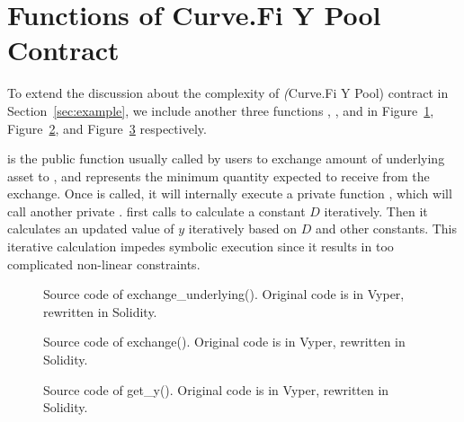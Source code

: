 \section{Functions of Curve.Fi Y Pool Contract}

To extend the discussion about the complexity of \emph(Curve.Fi Y Pool) contract
in Section~\ref{sec:example},
we include another three functions ,
,
and 
in Figure~\ref{fig:exchange_underlying},
Figure~\ref{fig:exchange},
and Figure~\ref{fig:get_y} respectively.

 is the public function usually called by users
to exchange  amount of underlying asset  to , and
 represents the minimum quantity expected to receive from the exchange. 
Once  is called, it will internally execute a private function 
, which will call another private . 
first calls  to calculate a constant $D$ iteratively. Then it calculates 
an updated value of $y$ iteratively based on $D$ and other constants. This iterative calculation
impedes symbolic execution since it results in too complicated non-linear constraints. 



\begin{figure}[t]
    \centering
    \begin{minipage}[h]{0.9\linewidth}
    
    \end{minipage}
    \caption{Source code of exchange\_underlying(). Original code is in Vyper, rewritten in Solidity.}
    \label{fig:exchange_underlying}
    \vspace{-2mm}
\end{figure}


\begin{figure}[t]
    \centering
    \begin{minipage}[h]{0.9\linewidth}
    
    \end{minipage}
    \caption{Source code of exchange(). Original code is in Vyper, rewritten in Solidity.}
    \label{fig:exchange}
    \vspace{-2mm}
\end{figure}



\begin{figure}[t]
    \centering
    \begin{minipage}[h]{0.9\linewidth}
    
    \end{minipage}
    \caption{Source code of get\_y(). Original code is in Vyper, rewritten in Solidity.}
    \label{fig:get_y}
    \vspace{-2mm}
\end{figure}




